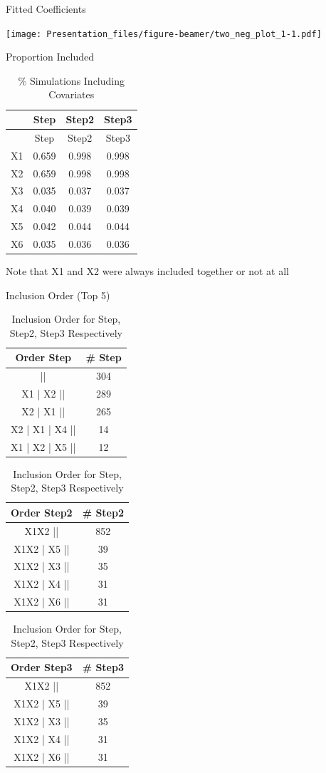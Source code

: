 \documentclass[ignorenonframetext,]{beamer}
\begin{document}
\begin{frame}{Fitted Coefficients}

\texttt{[image: Presentation\_files/figure-beamer/two\_neg\_plot\_1-1.pdf]}

\end{frame}

\begin{frame}{Proportion Included}

\begin{longtable}[]{@{}lccc@{}}
\caption{\% Simulations Including Covariates}\tabularnewline
\toprule
& Step & Step2 & Step3\tabularnewline
\midrule
\endfirsthead
\toprule
& Step & Step2 & Step3\tabularnewline
\midrule
\endhead
X1 & 0.659 & 0.998 & 0.998\tabularnewline
X2 & 0.659 & 0.998 & 0.998\tabularnewline
X3 & 0.035 & 0.037 & 0.037\tabularnewline
X4 & 0.040 & 0.039 & 0.039\tabularnewline
X5 & 0.042 & 0.044 & 0.044\tabularnewline
X6 & 0.035 & 0.036 & 0.036\tabularnewline
\bottomrule
\end{longtable}

Note that X1 and X2 were always included together or not at all

\end{frame}

\begin{frame}{Inclusion Order (Top 5)}

\begin{table}
\caption{Inclusion Order for Step, Step2, Step3 Respectively}

\centering
\begin{tabular}[t]{c|c}
\hline
Order Step & \# Step\\
\hline
|| & 304\\
\hline
X1 | X2 || & 289\\
\hline
X2 | X1 || & 265\\
\hline
X2 | X1 | X4 || & 14\\
\hline
X1 | X2 | X5 || & 12\\
\hline
\end{tabular}
\centering
\begin{tabular}[t]{c|c}
\hline
Order Step2 & \# Step2\\
\hline
X1X2 || & 852\\
\hline
X1X2 | X5 || & 39\\
\hline
X1X2 | X3 || & 35\\
\hline
X1X2 | X4 || & 31\\
\hline
X1X2 | X6 || & 31\\
\hline
\end{tabular}
\centering
\begin{tabular}[t]{c|c}
\hline
Order Step3 & \# Step3\\
\hline
X1X2 || & 852\\
\hline
X1X2 | X5 || & 39\\
\hline
X1X2 | X3 || & 35\\
\hline
X1X2 | X4 || & 31\\
\hline
X1X2 | X6 || & 31\\
\hline
\end{tabular}
\end{table}

\end{frame}
\end{document}
